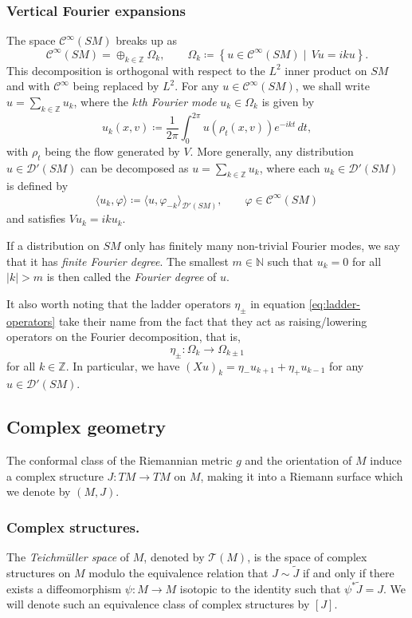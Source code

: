 \documentclass[reqno,12pt,letterpaper]{amsart}
\theoremstyle{definition}
\theoremstyle{remark}
\theoremstyle{definition}
\numberwithin{equation}{section}
\newcommand{\N}{\mathbb{N}}
\newcommand{\Z}{\mathbb{Z}}
\begin{document}
\subsubsection{Vertical Fourier expansions}\label{subsection:Fourier} The space $\mathcal{C}^\infty(SM)$ breaks up as 
$$\mathcal{C}^\infty(SM)=\oplus_{k\in \Z}\Omega_k, \qquad \Omega_k \coloneqq\left\{ u\in \mathcal{C}^\infty(SM)\mid \, V u = iku\right\}.$$
This decomposition is orthogonal with respect to the $L^2$ inner product on $SM$ and with $\mathcal{C}^\infty$ being replaced by $L^2$. For any $u\in \mathcal{C}^\infty(SM)$, we shall write $u=\sum_{k\in \Z}u_k$, where the \textit{$k$th Fourier mode} $u_k\in \Omega_k$ is given by
\begin{equation}\label{eq:definition-fourier-mode}
u_k(x,v)\coloneqq\dfrac{1}{2\pi}\int_0^{2\pi}u(\rho_t(x,v))e^{-ikt}\, dt,
\end{equation}
with $\rho_t$ being the flow generated by $V$. More generally, any distribution $u\in \mathcal{D}'(SM)$ can be decomposed as $u=\sum_{k\in \Z}u_k$, where each $u_k\in \mathcal{D}'(SM)$ is defined by 
$$\langle u_k , \varphi \rangle \coloneqq \langle u, \varphi_{-k}\rangle_{\mathcal{D}'(SM)}, \qquad \varphi\in \mathcal{C}^\infty(SM)$$
and satisfies $Vu_k = iku_k$. 

If a distribution on $SM$ only has finitely many non-trivial Fourier modes, we say that it has \textit{finite Fourier degree}. The smallest $m\in \N$ such that $u_k=0$ for all $|k|> m$ is then called the \textit{Fourier degree} of $u$. 

It also worth noting that the ladder operators $\eta_\pm$ in equation \eqref{eq:ladder-operators} take their name from the fact that they act as raising/lowering operators on the Fourier decomposition, that is, 
$$\eta_\pm : \Omega_k\to \Omega_{k\pm 1}$$
for all $k\in \Z$. In particular, we have $(Xu)_k = \eta_-u_{k+1}+\eta_+u_{k-1}$ for any $u\in \mathcal{D}'(SM)$. 

\subsection{Complex geometry}\label{subsection:complex-geometry} The conformal class of the Riemannian metric $g$ and the orientation of $M$ induce a complex structure $J: TM\to TM$ on $M$, making it into a Riemann surface which we denote by $(M, J)$. 
\subsubsection{Complex structures.} The \textit{Teichmüller space} of $M$, denoted by $\mathcal{T}(M)$, is the space of complex structures on $M$ modulo the equivalence relation that $J\sim \widetilde{J}$ if and only if there exists a diffeomorphism $\psi : M\to M$ isotopic to the identity such that $\psi^*\widetilde{J}=J$. We will denote such an equivalence class of complex structures by $[J]$. 
\end{document}
